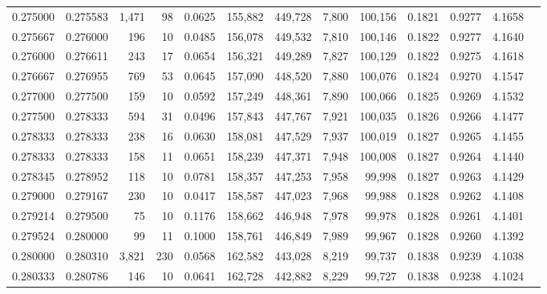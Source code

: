 \begin{tabular}{rrrrrrrrrrrrr}
0.275000 & 0.275583 & 1,471 &  98 &                                     0.0625 & 155,882 & 449,728 &   7,800 & 100,156 & 0.1821 & 0.9277 & 4.1658 \\
0.275667 & 0.276000 &   196 &  10 &                                     0.0485 & 156,078 & 449,532 &   7,810 & 100,146 & 0.1822 & 0.9277 & 4.1640 \\
0.276000 & 0.276611 &   243 &  17 &                                     0.0654 & 156,321 & 449,289 &   7,827 & 100,129 & 0.1822 & 0.9275 & 4.1618 \\
0.276667 & 0.276955 &   769 &  53 &                                     0.0645 & 157,090 & 448,520 &   7,880 & 100,076 & 0.1824 & 0.9270 & 4.1547 \\
0.277000 & 0.277500 &   159 &  10 &                                     0.0592 & 157,249 & 448,361 &   7,890 & 100,066 & 0.1825 & 0.9269 & 4.1532 \\
0.277500 & 0.278333 &   594 &  31 &                                     0.0496 & 157,843 & 447,767 &   7,921 & 100,035 & 0.1826 & 0.9266 & 4.1477 \\
0.278333 & 0.278333 &   238 &  16 &                                     0.0630 & 158,081 & 447,529 &   7,937 & 100,019 & 0.1827 & 0.9265 & 4.1455 \\
0.278333 & 0.278333 &   158 &  11 &                                     0.0651 & 158,239 & 447,371 &   7,948 & 100,008 & 0.1827 & 0.9264 & 4.1440 \\
0.278345 & 0.278952 &   118 &  10 &                                     0.0781 & 158,357 & 447,253 &   7,958 &  99,998 & 0.1827 & 0.9263 & 4.1429 \\
0.279000 & 0.279167 &   230 &  10 &                                     0.0417 & 158,587 & 447,023 &   7,968 &  99,988 & 0.1828 & 0.9262 & 4.1408 \\
0.279214 & 0.279500 &    75 &  10 &                                     0.1176 & 158,662 & 446,948 &   7,978 &  99,978 & 0.1828 & 0.9261 & 4.1401 \\
0.279524 & 0.280000 &    99 &  11 &                                     0.1000 & 158,761 & 446,849 &   7,989 &  99,967 & 0.1828 & 0.9260 & 4.1392 \\
0.280000 & 0.280310 & 3,821 & 230 &                                     0.0568 & 162,582 & 443,028 &   8,219 &  99,737 & 0.1838 & 0.9239 & 4.1038 \\
0.280333 & 0.280786 &   146 &  10 &                                     0.0641 & 162,728 & 442,882 &   8,229 &  99,727 & 0.1838 & 0.9238 & 4.1024 \\

\end{tabular}
